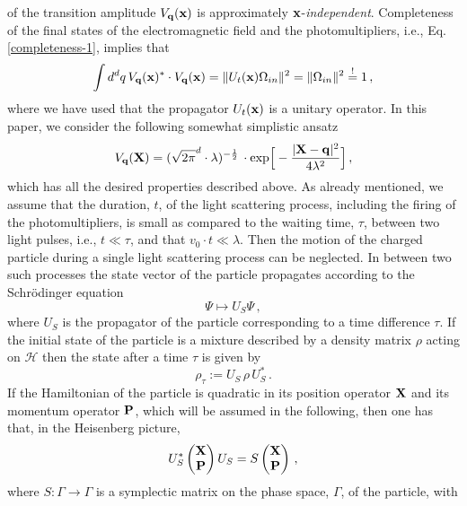 \documentclass[12pt]{article}
\begin{document}
of the transition amplitude $V_{\bf{q}}({\bf{x}})$ is approximately ${\bf{x}}$-\textit{independent}. Completeness of the final states of the electromagnetic field and the photomultipliers, i.e., Eq. \eqref{completeness-1}, implies that
\begin{equation}\label{completeness-2}
\int d^{d}q\, V_{\bf{q}} ({\bf{x}})^{*}\cdot V_{\bf{q}} ({\bf{x}}) = \Vert U_{t}({\bf{x}}) \Omega_{in} \Vert^{2} 
= \Vert \Omega_{in} \Vert^{2}\overset{!}{=} 1\,,
\end{equation}
where we have used that the propagator $U_{t}({\bf{x}})$ is a unitary operator. In this paper, we consider the following somewhat simplistic ansatz 
\begin{equation}\label{Gauss}
V_{{\bf{q}}} ({\bf{X}})= (\sqrt{2\pi}^{d}\cdot \lambda)^{-\frac{1}{2}}\, \cdot\text{exp}\Big[-\frac{\vert {\bf{X}}-{\bf{q}} \vert^{2}}{4\lambda^{2}}\Big]\,,
\end{equation}
which has all the desired properties described above.
As already mentioned, we assume that the duration, $t$, of the light scattering process, including the firing of the 
photomultipliers, is small as compared to the waiting time, $\tau$, between two light pulses, i.e., $t\ll \tau$, and that 
$v_0 \cdot t \ll \lambda$. Then the motion of the charged particle during a single light scattering process can be neglected.
In between two such processes the state vector of the particle propagates according to the Schr\"odinger equation 
$$\Psi \mapsto U_{S} \Psi\,,$$
where $U_{S}$ is the propagator of the particle corresponding to a time difference $\tau$. If the initial state of the particle is a mixture described by a density matrix $\rho$ acting on $\mathcal{H}$ then the state after a time $\tau$ is given by 
$$\rho_{\tau}:= U_{S}\, \rho\, U_{S}^{*}\,.$$
If the Hamiltonian of the particle is quadratic in its position operator ${\bf{X}}$ and its momentum operator ${\bf{P}}$, 
which will be assumed in the following, then one has that, in the Heisenberg picture,
\begin{equation}\label{evol}
U_{S}^{*} \begin{pmatrix}{\bf{X}}\\{\bf{P}}\end{pmatrix} U_{S}=S \begin{pmatrix} {\bf{X}}\\ {\bf{P}} \end{pmatrix}\,,
\end{equation}
where $S: \Gamma \rightarrow \Gamma$ is a symplectic matrix on the phase space, $\Gamma$, of the particle, with 
\end{document}
